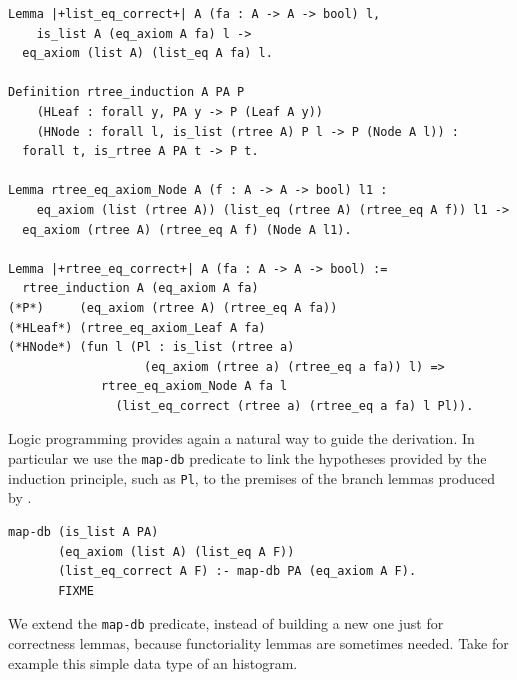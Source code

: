 \documentclass[sigplan,10pt,review]{acmart}\settopmatter{printfolios=true,printccs=false,printacmref=false}
\newcommand{\derive}[1]{\keys{#1}}
\begin{document}
\begin{minipage}{\textwidth}\begin{lstlisting}
Lemma |+list_eq_correct+| A (fa : A -> A -> bool) l,
    is_list A (eq_axiom A fa) l ->
  eq_axiom (list A) (list_eq A fa) l.

Definition rtree_induction A PA P  
    (HLeaf : forall y, PA y -> P (Leaf A y))
    (HNode : forall l, is_list (rtree A) P l -> P (Node A l)) :
  forall t, is_rtree A PA t -> P t.

Lemma rtree_eq_axiom_Node A (f : A -> A -> bool) l1 :
    eq_axiom (list (rtree A)) (list_eq (rtree A) (rtree_eq A f)) l1 ->
  eq_axiom (rtree A) (rtree_eq A f) (Node A l1).
       
Lemma |+rtree_eq_correct+| A (fa : A -> A -> bool) :=
  rtree_induction A (eq_axiom A fa)
(*P*)     (eq_axiom (rtree A) (rtree_eq A fa))
(*HLeaf*) (rtree_eq_axiom_Leaf A fa)
(*HNode*) (fun l (Pl : is_list (rtree a)
                   (eq_axiom (rtree a) (rtree_eq a fa)) l) =>
             rtree_eq_axiom_Node A fa l
               (list_eq_correct (rtree a) (rtree_eq a fa) l Pl)).
\end{lstlisting}\end{minipage}

Logic programming provides again a natural way to guide the
derivation. In particular we use the \lstinline+map-db+ predicate
to link the hypotheses provided by the induction principle,
such as \lstinline+Pl+, to the premises of the branch lemmas
produced by \derive{eqK}. 

\begin{minipage}{\textwidth}\begin{lstlisting}[]
map-db (is_list A PA)
       (eq_axiom (list A) (list_eq A F))
       (list_eq_correct A F) :- map-db PA (eq_axiom A F).
       FIXME
\end{lstlisting}\end{minipage}

\noindent
We extend the \lstinline+map-db+ predicate, instead of building
a new one just for correctness lemmas, because functoriality lemmas
are sometimes needed. Take for example this simple data type
of an histogram.
\end{document}
